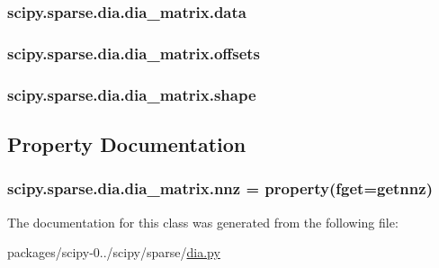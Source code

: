 \subsubsection[{data}]{\setlength{\rightskip}{0pt plus 5cm}scipy.\+sparse.\+dia.\+dia\+\_\+matrix.\+data}\label{classscipy_1_1sparse_1_1dia_1_1dia__matrix_a78d05cb0f3fe0e1acbf214ec07d92ac7}
\hypertarget{classscipy_1_1sparse_1_1dia_1_1dia__matrix_a8bfe11d2198fb7c967dadc0a024dde84}{}
\subsubsection[{offsets}]{\setlength{\rightskip}{0pt plus 5cm}scipy.\+sparse.\+dia.\+dia\+\_\+matrix.\+offsets}\label{classscipy_1_1sparse_1_1dia_1_1dia__matrix_a8bfe11d2198fb7c967dadc0a024dde84}
\hypertarget{classscipy_1_1sparse_1_1dia_1_1dia__matrix_a2a137f150710a5084f2e997ecb043d14}{}
\subsubsection[{shape}]{\setlength{\rightskip}{0pt plus 5cm}scipy.\+sparse.\+dia.\+dia\+\_\+matrix.\+shape}\label{classscipy_1_1sparse_1_1dia_1_1dia__matrix_a2a137f150710a5084f2e997ecb043d14}


\subsection{Property Documentation}
\hypertarget{classscipy_1_1sparse_1_1dia_1_1dia__matrix_a8fb306755f0c1bc24ce875367322be31}{}
\subsubsection[{nnz}]{\setlength{\rightskip}{0pt plus 5cm}scipy.\+sparse.\+dia.\+dia\+\_\+matrix.\+nnz = property(fget={\bf getnnz})\hspace{0.3cm}{\ttfamily [static]}}\label{classscipy_1_1sparse_1_1dia_1_1dia__matrix_a8fb306755f0c1bc24ce875367322be31}


The documentation for this class was generated from the following file\+:\begin{DoxyCompactItemize}
\item 
packages/scipy-\/0../scipy/sparse/\hyperlink{dia_8py}{dia.\+py}\end{DoxyCompactItemize}
